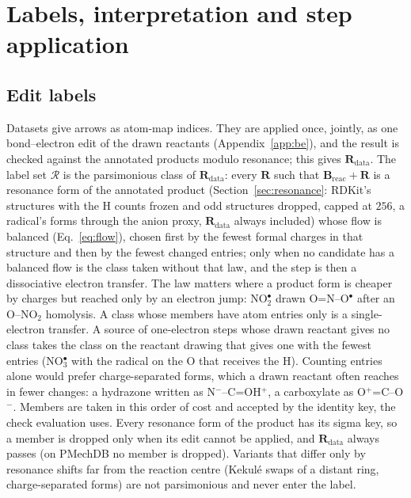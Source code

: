 \documentclass[11pt,a4paper]{article}
\newcommand{\vb}[1]{\bm{#1}}
\begin{document}
\section{Labels, interpretation and step application}

\subsection{Edit labels}
\label{sec:labels}
Datasets give arrows as atom-map indices. They are applied once, jointly, as one bond--electron edit of the drawn reactants (Appendix~\ref{app:be}), and the result is checked against the annotated products modulo resonance; this gives $\vb{R}_{\mathrm{data}}$. The label set $\mathcal{R}$ is the parsimonious class of $\vb{R}_{\mathrm{data}}$: every $\vb{R}$ such that $\vb{B}_{\mathrm{reac}}+\vb{R}$ is a resonance form of the annotated product (Section~\ref{sec:resonance}: RDKit's structures with the H counts frozen and odd structures dropped, capped at $256$, a radical's forms through the anion proxy, $\vb{R}_{\mathrm{data}}$ always included) whose flow is balanced (Eq.~\eqref{eq:flow}), chosen first by the fewest formal charges in that structure and then by the fewest changed entries; only when no candidate has a balanced flow is the class taken without that law, and the step is then a dissociative electron transfer. The law matters where a product form is cheaper by charges but reached only by an electron jump: NO$_2^\bullet$ drawn O=N--O$^\bullet$ after an O--NO$_2$ homolysis. A class whose members have atom entries only is a single-electron transfer. A source of one-electron steps whose drawn reactant gives no class takes the class on the reactant drawing that gives one with the fewest entries (NO$_3^\bullet$ with the radical on the O that receives the H). Counting entries alone would prefer charge-separated forms, which a drawn reactant often reaches in fewer changes: a hydrazone written as N$^-$--C=OH$^+$, a carboxylate as O$^+$=C--O$^-$. Members are taken in this order of cost and accepted by the identity key, the check evaluation uses. Every resonance form of the product has its sigma key, so a member is dropped only when its edit cannot be applied, and $\vb{R}_{\mathrm{data}}$ always passes (on PMechDB no member is dropped). Variants that differ only by resonance shifts far from the reaction centre (Kekul\'e swaps of a distant ring, charge-separated forms) are not parsimonious and never enter the label.
\end{document}
